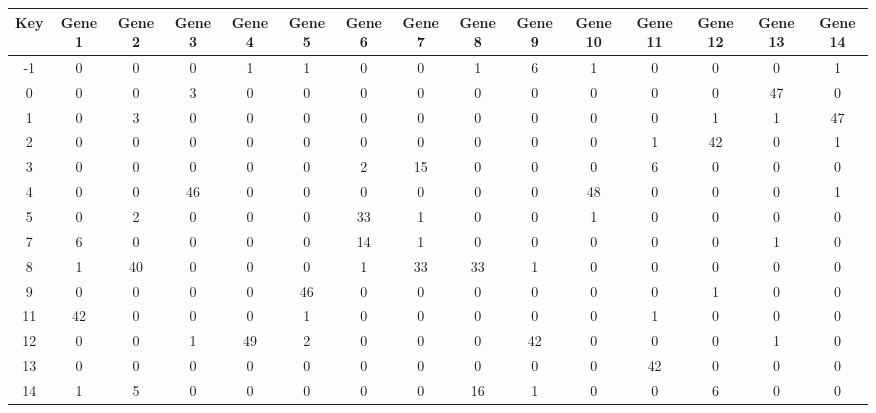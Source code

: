 \begin{tabular}{|c|c|c|c|c|c|c|c|c|c|c|c|c|c|c|}
\hline
Key & Gene 1 & Gene 2 & Gene 3 & Gene 4 & Gene 5 & Gene 6 & Gene 7 & Gene 8 & Gene 9 & Gene 10 & Gene 11 & Gene 12 & Gene 13 & Gene 14 \\
\hline
-1 & 0 & 0 & 0 & 1 & 1 & 0 & 0 & 1 & 6 & 1 & 0 & 0 & 0 & 1 \\
0 & 0 & 0 & 3 & 0 & 0 & 0 & 0 & 0 & 0 & 0 & 0 & 0 & 47 & 0 \\
1 & 0 & 3 & 0 & 0 & 0 & 0 & 0 & 0 & 0 & 0 & 0 & 1 & 1 & 47 \\
2 & 0 & 0 & 0 & 0 & 0 & 0 & 0 & 0 & 0 & 0 & 1 & 42 & 0 & 1 \\
3 & 0 & 0 & 0 & 0 & 0 & 2 & 15 & 0 & 0 & 0 & 6 & 0 & 0 & 0 \\
4 & 0 & 0 & 46 & 0 & 0 & 0 & 0 & 0 & 0 & 48 & 0 & 0 & 0 & 1 \\
5 & 0 & 2 & 0 & 0 & 0 & 33 & 1 & 0 & 0 & 1 & 0 & 0 & 0 & 0 \\
7 & 6 & 0 & 0 & 0 & 0 & 14 & 1 & 0 & 0 & 0 & 0 & 0 & 1 & 0 \\
8 & 1 & 40 & 0 & 0 & 0 & 1 & 33 & 33 & 1 & 0 & 0 & 0 & 0 & 0 \\
9 & 0 & 0 & 0 & 0 & 46 & 0 & 0 & 0 & 0 & 0 & 0 & 1 & 0 & 0 \\
11 & 42 & 0 & 0 & 0 & 1 & 0 & 0 & 0 & 0 & 0 & 1 & 0 & 0 & 0 \\
12 & 0 & 0 & 1 & 49 & 2 & 0 & 0 & 0 & 42 & 0 & 0 & 0 & 1 & 0 \\
13 & 0 & 0 & 0 & 0 & 0 & 0 & 0 & 0 & 0 & 0 & 42 & 0 & 0 & 0 \\
14 & 1 & 5 & 0 & 0 & 0 & 0 & 0 & 16 & 1 & 0 & 0 & 6 & 0 & 0 \\
\hline
\end{tabular}